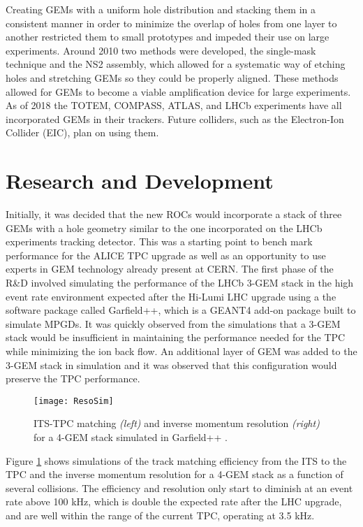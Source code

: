 Creating GEMs with a uniform hole distribution and stacking them in a consistent manner in order to minimize the overlap of holes from one layer to another restricted them to small prototypes and impeded their use on large experiments.  Around 2010 two methods were developed, the single-mask technique\cite{0960-1317-17-8-021} and the NS2 assembly\cite{1748-0221-12-06-C06036}, which allowed for a systematic way of etching holes and stretching GEMs so they could be properly aligned.  These methods allowed for GEMs to become a viable amplification device for large experiments.  As of 2018 the TOTEM, COMPASS, ATLAS, and LHCb experiments have all incorporated GEMs in their trackers.  Future colliders, such as the Electron-Ion Collider (EIC), plan on using them\cite{SAULI20162}.


\section{Research and Development}

Initially, it was decided that the new ROCs would incorporate a stack of three GEMs with a hole geometry similar to the one incorporated on the LHCb experiments\cite{Santimaria:1690550} tracking detector.  This was a starting point to bench mark performance for the ALICE TPC upgrade as well as an opportunity to use experts in GEM technology already present at CERN.  The first phase of the R\&D involved simulating the performance of the LHCb 3-GEM stack in the high event rate environment expected  after the Hi-Lumi LHC upgrade using a the software package called Garfield++\cite{PFEIFFER2019121}, which is a GEANT4\cite{Agostinelli:2002hh} add-on package built to simulate MPGDs.  It was quickly observed from the simulations that a 3-GEM stack would be insufficient in maintaining the performance needed for the TPC while minimizing the ion back flow.  An additional layer of GEM was added to the 3-GEM stack in simulation and it was observed that this configuration would preserve the TPC performance.

\begin{figure}[h]
\texttt{[image: ResoSim]}
\centering
\caption{ITS-TPC matching  \textit{(left)} and inverse momentum resolution \textit{(right)} for a 4-GEM stack simulated in Garfield++ \cite{Dick2017QM}. }
\label{fig:ResoSim}
\end{figure}

\noindent
Figure \ref{fig:ResoSim} shows simulations of the track matching efficiency from the ITS to the TPC and the inverse momentum resolution for a 4-GEM stack as a function of several collisions.  The efficiency and resolution only start to diminish at an event rate above 100 kHz, which is double the expected rate after the LHC upgrade, and are well within the range of the current TPC, operating at 3.5 kHz.
 
